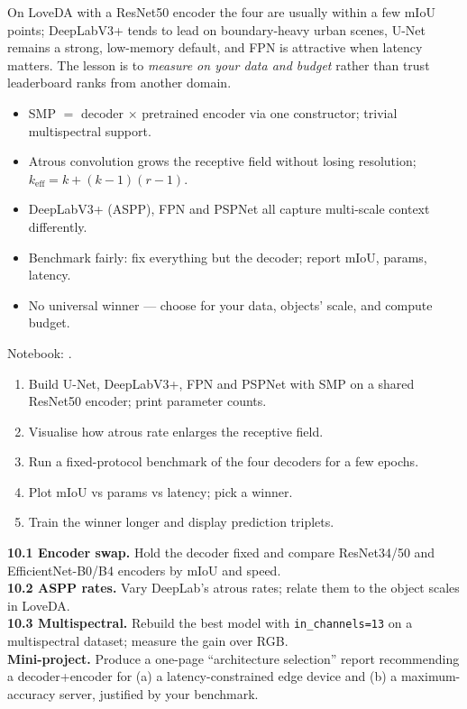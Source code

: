 \noindent On LoveDA with a ResNet50 encoder the four are usually within a few
mIoU points; DeepLabV3+ tends to lead on boundary-heavy urban scenes, U-Net
remains a strong, low-memory default, and FPN is attractive when latency
matters. The lesson is to \emph{measure on your data and budget} rather than
trust leaderboard ranks from another domain.

\begin{keybox}
\begin{itemize}[leftmargin=1.2em,nosep]
  \item SMP $=$ decoder $\times$ pretrained encoder via one constructor; trivial multispectral support.
  \item Atrous convolution grows the receptive field without losing resolution; $k_\mathrm{eff}=k+(k-1)(r-1)$.
  \item DeepLabV3+ (ASPP), FPN and PSPNet all capture multi-scale context differently.
  \item Benchmark fairly: fix everything but the decoder; report mIoU, params, latency.
  \item No universal winner --- choose for your data, objects' scale, and compute budget.
\end{itemize}
\end{keybox}

\begin{practbox}
Notebook: .
\begin{enumerate}[leftmargin=1.4em,nosep]
  \item Build U-Net, DeepLabV3+, FPN and PSPNet with SMP on a shared ResNet50
  encoder; print parameter counts.
  \item Visualise how atrous rate enlarges the receptive field.
  \item Run a fixed-protocol benchmark of the four decoders for a few epochs.
  \item Plot mIoU vs params vs latency; pick a winner.
  \item Train the winner longer and display prediction triplets.
\end{enumerate}
\end{practbox}

\begin{exbox}
\textbf{10.1 Encoder swap.} Hold the decoder fixed and compare ResNet34/50 and
EfficientNet-B0/B4 encoders by mIoU and speed.\\[2pt]
\textbf{10.2 ASPP rates.} Vary DeepLab's atrous rates; relate them to the object
scales in LoveDA.\\[2pt]
\textbf{10.3 Multispectral.} Rebuild the best model with \texttt{in\_channels=13}
on a multispectral dataset; measure the gain over RGB.\\[2pt]
\textbf{Mini-project.} Produce a one-page ``architecture selection'' report
recommending a decoder+encoder for (a) a latency-constrained edge device and (b)
a maximum-accuracy server, justified by your benchmark.
\end{exbox}
